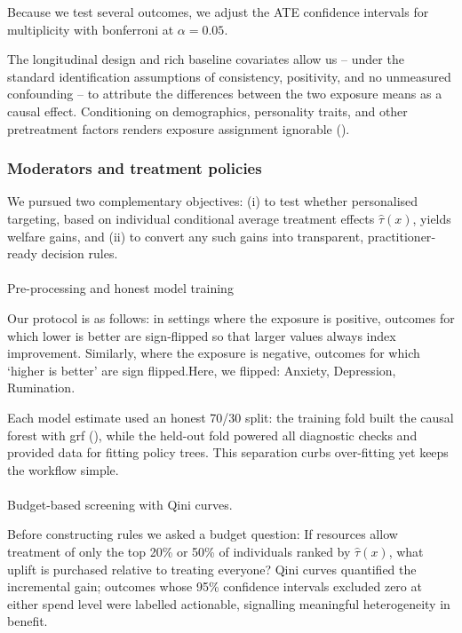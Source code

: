 \documentclass[
  single column]{article}
\makeatletter
\let\oldparagraph\paragraph
\renewcommand{\paragraph}{
    \@ifstar
      \xxxParagraphStar
      \xxxParagraphNoStar
  }
\newcommand{\xxxParagraphStar}[1]{\oldparagraph*{#1}\mbox{}}
\newcommand{\xxxParagraphNoStar}[1]{\oldparagraph{#1}\mbox{}}
\makeatother
\begin{document}
Because we test several outcomes, we adjust the ATE confidence intervals
for multiplicity with bonferroni at \(\alpha = 0.05\).

The longitudinal design and rich baseline covariates allow us -- under
the standard identification assumptions of consistency, positivity, and
no unmeasured confounding -- to attribute the differences between the
two exposure means as a causal effect. Conditioning on demographics,
personality traits, and other pretreatment factors renders exposure
assignment ignorable ().

\subsubsection{Moderators and treatment
policies}\label{moderators-and-treatment-policies}

We pursued two complementary objectives: (i) to test whether
personalised targeting, based on individual conditional average
treatment effects \(\hat\tau(x)\), yields welfare gains, and (ii) to
convert any such gains into transparent, practitioner‐ready decision
rules.

\paragraph{Pre-processing and honest model
training}\label{pre-processing-and-honest-model-training}

Our protocol is as follows: in settings where the exposure is positive,
outcomes for which lower is better are sign‐flipped so that larger
values always index improvement. Similarly, where the exposure is
negative, outcomes for which `higher is better' are sign flipped.Here,
we flipped: Anxiety, Depression, Rumination.

Each model estimate used an honest 70/30 split: the training fold built
the causal forest with grf (), while the held-out fold powered all diagnostic checks and
provided data for fitting policy trees. This separation curbs
over-fitting yet keeps the workflow simple.

\paragraph{Budget-based screening with Qini
curves.}\label{budget-based-screening-with-qini-curves.}

Before constructing rules we asked a budget question: If resources allow
treatment of only the top 20\% or 50\% of individuals ranked by
\(\hat\tau(x)\), what uplift is purchased relative to treating everyone?
Qini curves quantified the incremental gain; outcomes whose 95\%
confidence intervals excluded zero at either spend level were labelled
actionable, signalling meaningful heterogeneity in benefit.
\end{document}
